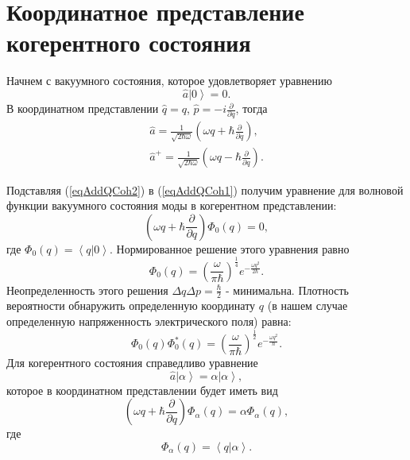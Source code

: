 \section{Координатное представление когерентного состояния}
\label{AddQCoh}
Начнем с вакуумного состояния, которое удовлетворяет уравнению 
\begin{equation}
\hat{a}\left|0\right> = 0.
\label{eqAddQCoh1}
\end{equation}
В координатном представлении $\hat{q} = q$, $\hat{p} = -i
\frac{\partial}{\partial q}$, тогда
\begin{eqnarray}
\hat{a} = \frac{1}{\sqrt{2 \hbar \omega}}
\left(
\omega q + \hbar \frac{\partial}{\partial q}
\right),
\nonumber \\
\hat{a}^{+} = \frac{1}{\sqrt{2 \hbar \omega}}
\left(
\omega q - \hbar \frac{\partial}{\partial q}
\right).
\label{eqAddQCoh2}
\end{eqnarray}

Подставляя (\ref{eqAddQCoh2}) в (\ref{eqAddQCoh1}) получим уравнение
для волновой функции вакуумного состояния моды в когерентном
представлении:
\begin{equation}
\left(
\omega q + \hbar \frac{\partial}{\partial q}
\right) \Phi_0\left(q\right) = 0,
\label{eqAddQCoh3}
\end{equation}
где $\Phi_0\left(q\right) = \left<q\right|\left.0\right>$.
Нормированное решение этого уравнения равно
\begin{equation}
\Phi_0\left(q\right) = \left(\frac{\omega}{\pi
  \hbar}\right)^{\frac{1}{4}} e^{-\frac{\omega q^2}{2 \hbar}}.
\nonumber
\end{equation}
Неопределенность этого решения $\Delta q \Delta p =
\frac{\hbar}{2}$ - минимальна. Плотность вероятности обнаружить
определенную координату $q$ (в нашем случае определенную напряженность
электрического поля) равна:
\begin{equation}
\Phi_0\left(q\right)\Phi_0^{*}\left(q\right) = \left(\frac{\omega}{\pi
  \hbar}\right)^{\frac{1}{2}} e^{-\frac{\omega q^2}{\hbar}}.
\label{eqAddQCoh4}
\end{equation}
Для когерентного состояния справедливо уравнение
\[
\hat{a}\left|\alpha\right> = \alpha \left|\alpha\right>,
\]
которое в координатном представлении будет иметь вид
\begin{equation}
\left(
\omega q + \hbar \frac{\partial}{\partial q}
\right) \Phi_{\alpha}\left(q\right) = 
\alpha \Phi_{\alpha}\left(q\right),
\label{eqAddQCoh5}
\end{equation}
где 
\[
\Phi_{\alpha}\left(q\right) = \left<q\right|\left.\alpha\right>.
\]

